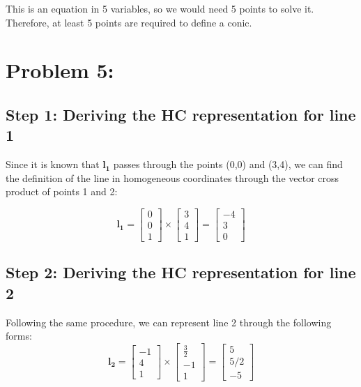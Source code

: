 \documentclass{article}
\begin{document}
This is an equation in 5 variables, so we would need 5 points to solve it. Therefore, at least 5 points are required to define a conic. 



\newpage
\section*{Problem 5:}
\subsection*{Step 1: Deriving the HC representation for line 1}
Since it is known that $\boldsymbol{l_1}$ passes through the points (0,0) and (3,4), we can find the definition of the line in homogeneous coordinates through the vector cross product of points 1 and 2:

\[\boldsymbol{l_1} = \begin{bmatrix}
    0 \\ 0 \\ 1
\end{bmatrix} \times \begin{bmatrix}
    3 \\ 4 \\ 1
\end{bmatrix} = \begin{bmatrix}
    -4 \\ 3 \\ 0
\end{bmatrix}\]

\subsection*{Step 2: Deriving the HC representation for line 2}
Following the same procedure, we can represent line 2 through the following forms:
\[\boldsymbol{l_2} = \begin{bmatrix}
    -1 \\ 4 \\ 1
\end{bmatrix} \times \begin{bmatrix}
    \frac{3}{2} \\ -1 \\ 1
\end{bmatrix} = \begin{bmatrix}
    5 \\ 5/2 \\ -5
\end{bmatrix}\]
\end{document}
